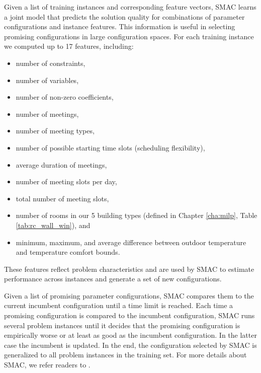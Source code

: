 Given a list of training instances and corresponding feature vectors, SMAC learns a joint model that predicts the solution quality for combinations of parameter configurations and instance features. This information is useful in selecting promising configurations in large configuration spaces. For each training instance we computed up to 17 features, including: 

\begin{itemize}
\item number of constraints, 
\item number of variables, 
\item number of non-zero coefficients, 
\item number of meetings, 
\item number of meeting types, 
\item number of possible starting time slots (scheduling flexibility), 
\item average duration of meetings, 
\item number of meeting slots per day, 
\item total number of meeting slots, 
\item number of rooms in our 5 building types (defined in Chapter \ref{cha:milp}, Table \ref{tab:rc_wall_win}), and 
\item minimum, maximum, and average difference between outdoor temperature and temperature comfort bounds.
\end{itemize}
These features reflect problem characteristics and are used by SMAC to estimate performance across instances and generate a set of new configurations.

Given a list of promising parameter configurations, SMAC compares them to the current incumbent configuration until a time limit is reached. Each time a promising configuration is compared to the incumbent configuration, SMAC runs several problem instances until it decides that the promising configuration is empirically worse or at least as good as the incumbent configuration. In the latter case the incumbent is updated. In the end, the configuration selected by SMAC is generalized to all problem instances in the training set. For more details about SMAC, we refer readers to \cite{hutter2011sequential}.

